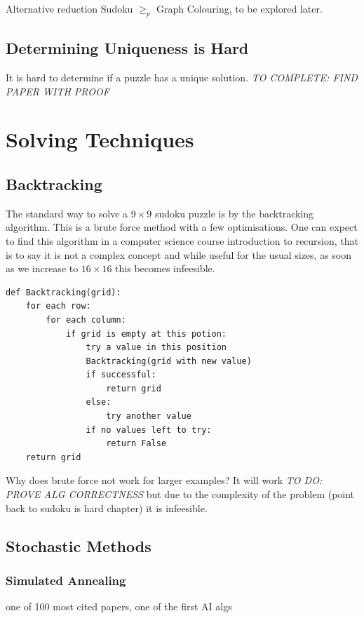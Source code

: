\documentclass[a4paper,12pt]{article}
\begin{document}
Alternative reduction Sudoku $\geq_p$  Graph Colouring, to be explored later.

	\subsection{Determining Uniqueness is Hard}

It is hard to determine if a puzzle has a unique solution. 	 \textit{TO COMPLETE: FIND PAPER WITH PROOF}
		
\section{Solving Techniques}
\subsection{Backtracking}
The standard way to solve a $9 \times 9$ sudoku puzzle is by the backtracking algorithm. This is a brute force method with a few optimisations. One can expect to find this algorithm in a computer science course introduction to recursion, that is to say it is not a complex concept and while useful for the usual sizes, as soon as we increase to $16 \times 16$ this becomes infeesible. 
\begin{lstlisting}[caption=Backtracking]
def Backtracking(grid):
    for each row:
        for each column:
            if grid is empty at this potion:
                try a value in this position
                Backtracking(grid with new value)
                if successful:
                    return grid
                else:
                    try another value
                if no values left to try:
                    return False
    return grid						
\end{lstlisting}
Why does brute force not work for larger examples? It will work \textit{TO DO: PROVE ALG CORRECTNESS} but due to the complexity of the problem (point back to sudoku is hard chapter) it is infeesible.
\subsection{Stochastic Methods}
\subsubsection{Simulated Annealing} 
\cite{simulated annealing} one of 100 most cited papers, one of the first AI algs
\end{document}
